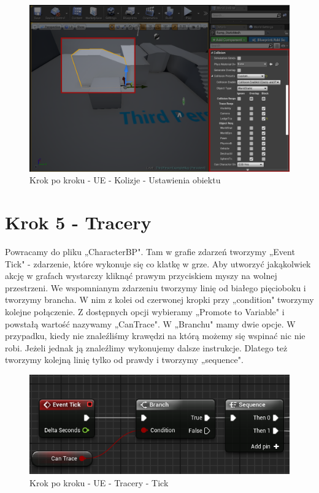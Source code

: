 \documentclass[12pt]{xmgr}
\begin{document}
\begin{figure}[!htb]
    \begin{center}
    \includegraphics[scale=0.35]{Screeny/UeKrokPoKroku/UE-Climb-ObjectCollision}
    \end{center}
    \caption{Krok po kroku - UE - Kolizje - Ustawienia obiektu}
\end{figure}

\newpage
\section{Krok 5 - Tracery}

Powracamy do pliku „CharacterBP". Tam w grafie zdarzeń tworzymy „Event Tick" - zdarzenie, które wykonuje się co klatkę w grze. Aby utworzyć jakąkolwiek akcję w grafach wystarczy kliknąć prawym przyciskiem myszy na wolnej przestrzeni. We wspomnianym zdarzeniu tworzymy linię od białego pięcioboku i tworzymy brancha. W nim z kolei od czerwonej kropki przy „condition" tworzymy kolejne połączenie. Z dostępnych opcji wybieramy „Promote to Variable" i powstałą wartość nazywamy „CanTrace".
W „Branchu" mamy dwie opcje. W przypadku, kiedy nie znaleźliśmy krawędzi na którą możemy się wspinać nic nie robi. Jeżeli jednak ją znaleźlimy wykonujemy dalsze instrukcje. Dlatego też tworzymy kolejną linię tylko od prawdy i tworzymy „sequence".

\begin{figure}[!htb]
    \begin{center}
    \includegraphics[scale=0.5]{Screeny/UeKrokPoKroku/UE-Tick}
    \end{center}
    \caption{Krok po kroku - UE - Tracery - Tick}
\end{figure}
\end{document}
